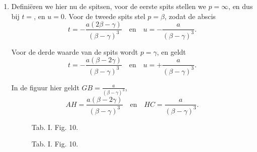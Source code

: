\documentclass[10pt,a4paper]{article}
\newcommand{\switchenum}{\setcounter{enumi}{\arabic{enumi}-1}\switchcolumn}
\begin{document}
\begin{paracol}{2}
\begin{enumerate}[topsep=1px]
		\switchenum
		\item Definiëren we hier nu de spitsen, voor de eerste spits stellen we $p=\infty$, en dus bij $t=$, en $u=0$. Voor de tweede spits stel $p=\beta$, zodat de abscis
		\[
			t = -\frac{a(2\beta- \gamma)}{(\beta - \gamma)^3} \quad \text{en} \quad u = - \frac{a}{(\beta-\gamma)^3}.
		\]
		\par Voor de derde waarde van de spits wordt $p=\gamma$, en geldt 
		\[
			t = -\frac{a(\beta - 2\gamma)}{(\beta-\gamma)^3} \quad \text{en}\quad u = +\frac{a}{(\beta-\gamma)^3}.
		\]
		\par In de figuur hier geldt $GB = \frac{a}{(\beta - \gamma)^3}$,
		\[
			AH = \frac{a(\beta - 2\gamma)}{(\beta - \gamma)^3} \quad \text{en}\quad HC = \frac{a}{(\beta - \gamma)^3}.
		\]
		
		\switchcolumn*
		
		\begin{figure}[h]
			\centering
			\par {
				\selectfont
				\begin{tikzpicture}[rotate=180, scale=1]
				
				\end{tikzpicture}}
			\selectfont
			\caption{Tab. I. Fig. 10.}
		\end{figure}
		\switchcolumn
		\begin{figure}[h]
			\centering
			\par {
				\selectfont
				\begin{tikzpicture}[rotate=180, scale=1]
				
				\end{tikzpicture}}
			\selectfont
			\caption{Tab. I. Fig. 10.}
		\end{figure}
		
		\switchcolumn*
		

\end{enumerate}
\end{paracol}
\end{document}
